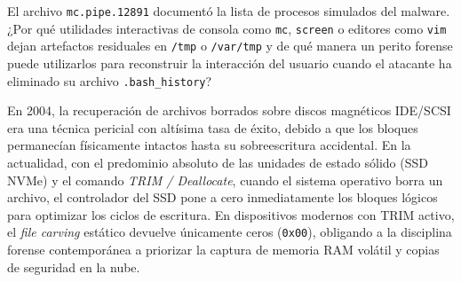 \begin{retoforense}
El archivo \texttt{mc.pipe.12891} documentó la lista de procesos simulados del malware. ¿Por qué utilidades interactivas de consola como \texttt{mc}, \texttt{screen} o editores como \texttt{vim} dejan artefactos residuales en \texttt{/tmp} o \texttt{/var/tmp} y de qué manera un perito forense puede utilizarlos para reconstruir la interacción del usuario cuando el atacante ha eliminado su archivo \texttt{.bash\_history}?
\end{retoforense}

\begin{perspectiva20}
En 2004, la recuperación de archivos borrados sobre discos magnéticos IDE/SCSI era una técnica pericial con altísima tasa de éxito, debido a que los bloques permanecían físicamente intactos hasta su sobreescritura accidental. En la actualidad, con el predominio absoluto de las unidades de estado sólido (SSD NVMe) y el comando \textit{TRIM / Deallocate}, cuando el sistema operativo borra un archivo, el controlador del SSD pone a cero inmediatamente los bloques lógicos para optimizar los ciclos de escritura. En dispositivos modernos con TRIM activo, el \textit{file carving} estático devuelve únicamente ceros (\texttt{0x00}), obligando a la disciplina forense contemporánea a priorizar la captura de memoria RAM volátil y copias de seguridad en la nube.
\end{perspectiva20}

